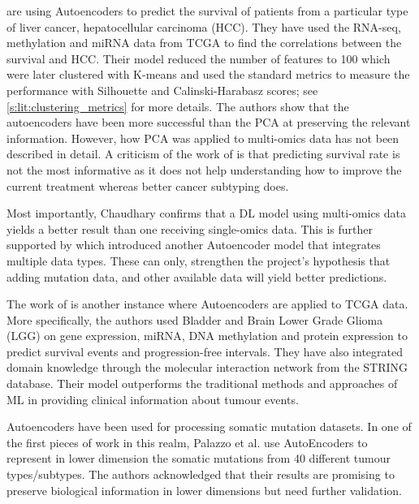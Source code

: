 \citet{Chaudhary2018-qj} are using Autoencoders to predict the survival of patients from a particular type of liver cancer, hepatocellular carcinoma (HCC). They have used the RNA-seq, methylation and miRNA data from TCGA to find the correlations between the survival and HCC. Their model reduced the number of features to 100 which were later clustered with K-means and used the standard metrics to measure the performance with Silhouette and Calinski-Harabasz scores; see \cref{s:lit:clustering_metrics} for more details. The authors show that the autoencoders have been more successful than the PCA at preserving the relevant information. However, how PCA was applied to multi-omics data has not been described in detail. A criticism of the work of \citet{Chaudhary2018-qj} is that predicting survival rate is not the most informative as it does not help understanding how to improve the current treatment whereas better cancer subtyping does.

Most importantly, Chaudhary confirms that a DL model using multi-omics data yields a better result than one receiving single-omics data. This is further supported by \citet{Ma2019-hk} which introduced another Autoencoder model that integrates multiple data types. These can only, strengthen the project's hypothesis that adding mutation data, and other available data will yield better predictions.

The work of \citet{Ma2019-hk} is another instance where Autoencoders are applied to TCGA data. More specifically, the authors used Bladder and Brain Lower Grade Glioma (LGG) on gene expression, miRNA, DNA methylation and protein expression to predict survival events and progression-free intervals. They have also integrated domain knowledge through the molecular interaction network from the STRING database. Their model outperforms the traditional methods and approaches of ML in providing clinical information about tumour events.

Autoencoders have been used for processing somatic mutation datasets. In one of the first pieces of work in this realm, Palazzo et al. \cite{Palazzo2019-hx} use AutoEncoders to represent in lower dimension the somatic mutations from 40 different tumour types/subtypes. The authors acknowledged that their results are promising to preserve biological information in lower dimensions but need further validation.


